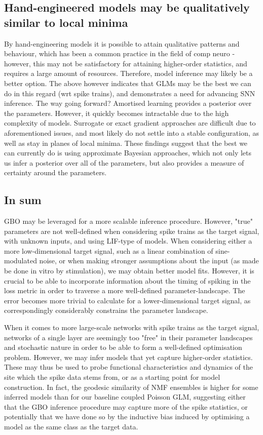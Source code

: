 \documentclass[mphil,deptreport,ianc]{infthesis} %
\begin{document}
\subsection*{Hand-engineered models may be qualitatively similar to local minima}
By hand-engineering models it is possible to attain qualitative patterns and behaviour, which has been a common practice in the field of comp neuro - however, this may not be satisfactory for attaining higher-order statistics, and requires a large amount of resources. Therefore, model inference may likely be a better option. 
The above however indicates that GLMs may be the best we can do in this regard (wrt spike trains), and demonstrates a need for advancing SNN inference.
The way going forward?
Amortised learning provides a posterior over the parameters.
However, it quickly becomes intractable due to the high complexity of models.
Surrogate or exact gradient approaches are difficult due to aforementioned issues, and most likely do not settle into a stable configuration, as well as stay in planes of local minima.
These findings suggest that the best we can currently do is using approximate Bayesian approaches, which not only lets us infer a posterior over all of the parameters, but also provides a measure of certainty around the parameters.

\subsection*{In sum}

GBO may be leveraged for a more scalable inference procedure.
However, "true" parameters are not well-defined when considering spike trains as the target signal, with unknown inputs, and using LIF-type of models.
When considering either a more low-dimensional target signal, such as a linear combination of sine-modulated noise, or when making stronger assumptions about the input (as made be done in vitro by stimulation), we may obtain better model fits.
However, it is crucial to be able to incorporate information about the timing of spiking in the loss metric in order to traverse a more well-defined parameter-landscape.
The error becomes more trivial to calculate for a lower-dimensional target signal, as correspondingly considerably constrains the parameter landscape.

When it comes to more large-scale networks with spike trains as the target signal, networks of a single layer are seemingly too "free" in their parameter landscapes and stochastic nature in order to be able to form a well-defined optimisation problem.
However, we may infer models that yet capture higher-order statistics.
These may thus be used to probe functional characteristics and dynamics of the site which the spike data stems from, or as a starting point for model construction.
In fact, the geodesic similarity of NMF ensembles is higher for some inferred models than for our baseline coupled Poisson GLM, suggesting either that the GBO inference procedure may capture more of the spike statistics, or potentially that we have done so by the inductive bias induced by optimising a model as the same class as the target data.
\end{document}
